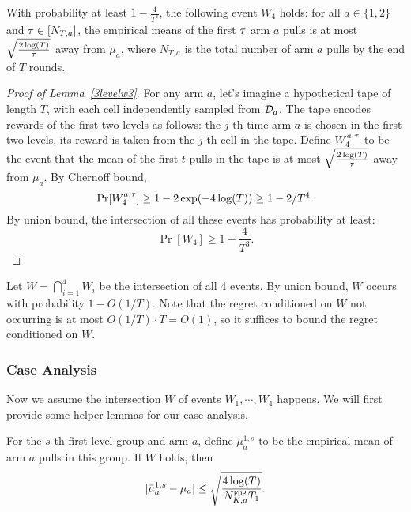 
\begin{lemma}\label{3levelw3}
  With probability at least $1 - \frac{4}{T^3}$, the following event
  $W_4$ holds: for all $a\in \{1, 2\}$ and $\tau \in [N_{T, a}]$, the
  empirical means of the first $\tau$
  arm $a$ pulls is at most
  $\sqrt{\frac{2\log(T)}{\tau}}$ away from $\mu_a$, where $N_{T, a}$ is
  the total number of arm $a$ pulls by the end of $T$ rounds.
\end{lemma}


\begin{proof}[Proof of Lemma~\ref{3levelw3}]
  For any arm $a$, let's imagine a hypothetical tape of length $T$,
  with each cell independently sampled from $\mathcal{D}_a$. The tape encodes
  rewards of the first two levels as follows: the $j$-th time arm $a$
  is chosen in the first two levels, its reward is taken from the
  $j$-th cell in the tape. Define $W_4^{a,\tau}$ to be the event that the
  mean of the first $t$ pulls in the tape is at most
  $\sqrt{\frac{2\log(T)}{\tau}}$ away from $\mu_a$. By Chernoff bound,
\[
\Pr[W_4^{a,\tau}] \geq 1 - 2\exp(-4\log(T)) \geq 1- 2/T^4.
\]
By union bound, the intersection of all these events has probability
at least:
\[
\Pr[W_4] \geq 1- \frac{4}{T^3}.
\]
\end{proof}


Let $W = \bigcap_{i=1}^4 W_i$ be the intersection of all 4
events.  By union bound, $W$ occurs with probability $1-O(1/T)$. Note
that the regret conditioned on $W$ not occurring is at most
$O(1/T) \cdot T = O(1)$, so it suffices to bound the regret conditioned on $W$.








\subsubsection*{Case Analysis}
Now we assume the intersection $W$ of events $W_1,\cdots,W_4$ happens. We will
first provide some helper lemmas for our case analysis.

\begin{lemma}
  For the $s$-th first-level group and arm $a$, define
  $\bar{\mu}_a^{1,s}$ to be the empirical mean of arm $a$ pulls in
  this group. If $W$ holds, then
  \[
    |\bar{\mu}_a^{1,s} - \mu_a| \leq \sqrt{\frac{4\log(T)}{N^\mathtt{FDP}_{K,a} T_1}}.
  \]
\end{lemma}

